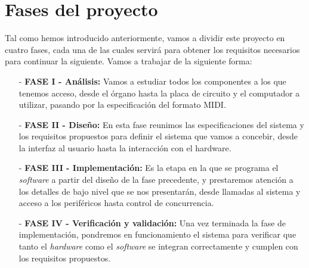 \section{Fases del proyecto}

Tal como hemos introducido anteriormente, vamos a dividir este proyecto en cuatro fases, cada una de las cuales servirá para obtener los requisitos necesarios para continuar la siguiente. Vamos a trabajar de la siguiente forma:

\begin{enumerate}
	\item[-] \textbf{FASE I - Análisis:} Vamos a estudiar todos los componentes a los que tenemos acceso, desde el órgano hasta la placa de circuito y el computador a utilizar, pasando por la especificación del formato MIDI.
	
	\item[-] \textbf{FASE II - Diseño:} En esta fase reunimos las especificaciones del sistema y los requisitos propuestos para definir el sistema que vamos a concebir, desde la interfaz al usuario hasta la interacción con el hardware.
	
	\item[-] \textbf{FASE III - Implementación:} Es la etapa en la que se programa el \textit{software} a partir del diseño de la fase precedente, y prestaremos atención a los detalles de bajo nivel que se nos presentarán, desde llamadas al sistema y acceso a los periféricos hasta control de concurrencia.
	
	\item[-] \textbf{FASE IV - Verificación y validación:} Una vez terminada la fase de implementación, pondremos en funcionamiento el sistema para verificar que tanto el \textit{hardware} como el \textit{software} se integran correctamente y cumplen con los requisitos propuestos.
	
\end{enumerate}

\clearpage{\cleardoublepage}
\clearpage{\pagestyle{empty}\cleardoublepage}
